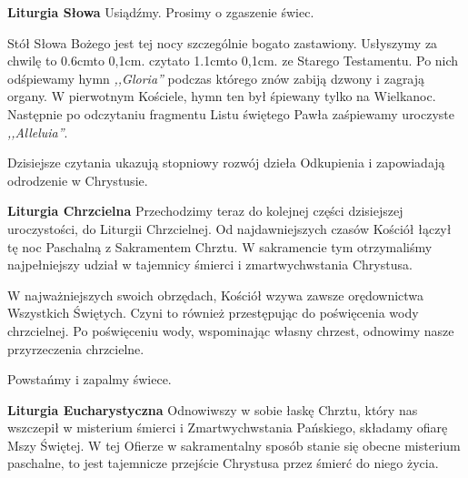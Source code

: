 \documentclass[10pt,oneside,final,notitlepage,a4paper,wide]{mwart}
\def\dotfill#1{\cleaders\hbox to #1{.}\hfill}
\newcommand\dotline[2][0,1cm]{\leavevmode\hbox to #2{\dotfill{#1}\hfil}}
\begin{document}
	\textbf{Liturgia Słowa} Usiądźmy. Prosimy o zgaszenie świec.
\par Stół Słowa Bożego jest tej nocy szczególnie bogato zastawiony. Usłyszymy za chwilę \dotline{0.6cm} czyta\dotline{1.1cm} ze Starego Testamentu. Po nich odśpiewamy hymn \emph{,,Gloria''} podczas którego znów zabiją dzwony i zagrają organy. W pierwotnym Kościele, hymn ten był śpiewany tylko na Wielkanoc. Następnie po odczytaniu fragmentu Listu świętego Pawła zaśpiewamy uroczyste \emph{,,Alleluia''}.
\par Dzisiejsze czytania ukazują stopniowy rozwój dzieła Odkupienia i zapowiadają odrodzenie w Chrystusie. \newpage %

	\textbf{Liturgia Chrzcielna} Przechodzimy teraz do kolejnej części dzisiejszej uroczystości, do Liturgii Chrzcielnej. Od najdawniejszych czasów Kościół łączył tę noc Paschalną z Sakramentem Chrztu. W sakramencie tym otrzymaliśmy najpełniejszy udział w tajemnicy śmierci i zmartwychwstania Chrystusa.
\par W najważniejszych swoich obrzędach, Kościół wzywa zawsze orędownictwa Wszystkich Świętych. Czyni to również przestępując do poświęcenia wody chrzcielnej. Po poświęceniu wody, wspominając własny chrzest, odnowimy nasze przyrzeczenia chrzcielne.
\par Powstańmy i zapalmy świece. \bigskip

	\textbf{Liturgia Eucharystyczna} Odnowiwszy w sobie łaskę Chrztu, który nas wszczepił w misterium śmierci i Zmartwychwstania Pańskiego, składamy ofiarę Mszy Świętej. W tej Ofierze w sakramentalny sposób stanie się obecne misterium paschalne, to jest tajemnicze przejście Chrystusa przez śmierć do niego życia.
\end{document}
